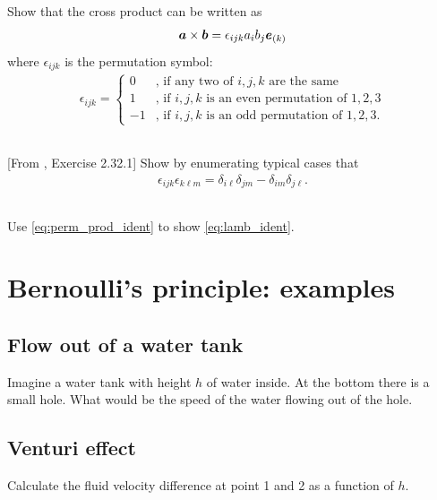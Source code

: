 \documentclass[11pt,letterpaper]{report}
\begin{document}
\subsection{}
Show that the cross product can be written as
\begin{align}
    \boldsymbol{a}\times \boldsymbol{b} = \epsilon_{ijk}a_ib_j\boldsymbol{e}_{(k)}
\end{align}
where $\epsilon_{ijk}$ is the permutation symbol:
\begin{align}
    \epsilon_{ijk} = \begin{cases}
        0 &\text{, if any two of $i,j,k$ are the same}\\
        1 &\text{, if $i,j,k$ is an even permutation of $1,2,3$}\\
        -1 &\text{, if $i,j,k$ is an odd permutation of $1,2,3$}.
    \end{cases}
\end{align}

\subsection{}
[From \cite{Aris_62}, Exercise 2.32.1] Show by enumerating typical cases that
\begin{align}
    \epsilon_{ijk}\epsilon_{k\ell m} = \delta_{i\ell}\delta_{jm}-\delta_{im}\delta_{j\ell}.\label{eq:perm_prod_ident}
\end{align}

\subsection{}
Use \eqref{eq:perm_prod_ident} to show \eqref{eq:lamb_ident}.

\section{Bernoulli's principle: examples}
\subsection{Flow out of a water tank}
Imagine a water tank with height $h$ of water inside. At the bottom there is a small hole. What would be the speed of the water flowing out of the hole.

\subsection{Venturi effect}
Calculate the fluid velocity difference at point 1 and 2 as a function of $h$.
\end{document}
